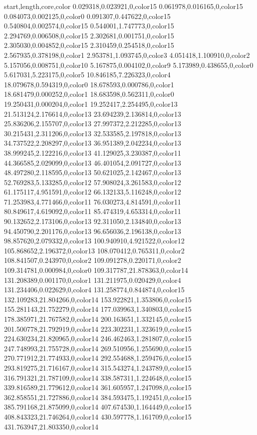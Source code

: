start,length,core,color
0.029318,0.023921,0,color15
0.061978,0.016165,0,color15
0.084073,0.002125,0,color0
0.091307,0.447622,0,color15
0.540804,0.002574,0,color15
0.544001,1.747773,0,color15
2.294769,0.006508,0,color15
2.302681,0.001751,0,color15
2.305030,0.004852,0,color15
2.310459,0.254518,0,color15
2.567935,0.378198,0,color1
2.953781,1.093745,0,color3
4.051418,1.100910,0,color2
5.157056,0.008751,0,color10
5.167875,0.004102,0,color9
5.173989,0.438655,0,color0
5.617031,5.223175,0,color5
10.846185,7.226323,0,color4
18.079678,0.594319,0,color0
18.678593,0.000786,0,color1
18.681479,0.000252,0,color1
18.683598,0.562311,0,color0
19.250431,0.000204,0,color1
19.252417,2.254495,0,color13
21.513124,2.176614,0,color13
23.694239,2.136814,0,color13
25.836206,2.155707,0,color13
27.997372,2.212285,0,color13
30.215431,2.311206,0,color13
32.533585,2.197818,0,color13
34.737522,2.208297,0,color13
36.951389,2.042234,0,color13
38.999245,2.122216,0,color13
41.129025,3.230387,0,color11
44.366585,2.029099,0,color13
46.401054,2.091727,0,color13
48.497280,2.118595,0,color13
50.621025,2.142467,0,color13
52.769283,5.133285,0,color12
57.908024,3.261583,0,color12
61.175117,4.951591,0,color12
66.132133,5.116248,0,color12
71.253983,4.771466,0,color11
76.030273,4.814591,0,color11
80.849617,4.619092,0,color11
85.474319,4.653314,0,color11
90.132652,2.173106,0,color13
92.311050,2.134840,0,color13
94.450790,2.201176,0,color13
96.656036,2.196138,0,color13
98.857620,2.079332,0,color13
100.940910,4.921522,0,color12
105.868652,2.196372,0,color13
108.070412,0.765311,0,color2
108.841507,0.243970,0,color2
109.091278,0.220171,0,color2
109.314781,0.000984,0,color0
109.317787,21.878363,0,color14
131.208389,0.001170,0,color1
131.211975,0.020429,0,color4
131.234406,0.022629,0,color4
131.258774,0.844874,0,color15
132.109283,21.804266,0,color14
153.922821,1.353806,0,color15
155.281143,21.752279,0,color14
177.039963,1.340803,0,color15
178.385971,21.767582,0,color14
200.163651,1.332145,0,color15
201.500778,21.792919,0,color14
223.302231,1.323619,0,color15
224.630234,21.820965,0,color14
246.462463,1.281807,0,color15
247.748993,21.755728,0,color14
269.510956,1.255690,0,color15
270.771912,21.774933,0,color14
292.554688,1.259476,0,color15
293.819275,21.716167,0,color14
315.543274,1.243789,0,color15
316.791321,21.787109,0,color14
338.587311,1.224648,0,color15
339.816589,21.779612,0,color14
361.605957,1.247098,0,color15
362.858551,21.727886,0,color14
384.593475,1.192451,0,color15
385.791168,21.875099,0,color14
407.674530,1.164449,0,color15
408.843323,21.746264,0,color14
430.597778,1.161709,0,color15
431.763947,21.803350,0,color14
